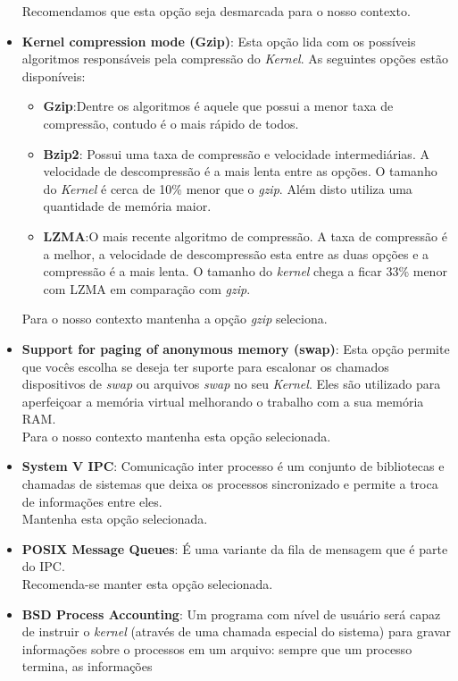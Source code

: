 \documentclass[a4paper,10pt]{article}
\begin{document}
\begin{itemize}
	      Recomendamos que esta opção seja desmarcada para o nosso contexto.
	\item \textbf{Kernel compression mode (Gzip)}: Esta opção lida com os possíveis algoritmos responsáveis pela compressão do \emph{Kernel}. 
	      As seguintes opções estão disponíveis:
	      \begin{itemize}
	      \item \textbf{Gzip}:Dentre os algoritmos é aquele que possui a menor taxa de compressão, contudo é o mais rápido de todos.
	      \item \textbf{Bzip2}: Possui uma taxa de compressão e velocidade intermediárias. A velocidade de descompressão é a mais lenta entre
		      as opções. O tamanho do \emph{Kernel} é cerca de 10\% menor que o \emph{gzip}. Além disto utiliza uma quantidade de memória
		      maior.
	      \item \textbf{LZMA}:O mais recente algoritmo de compressão. A taxa de compressão é a melhor, a velocidade de descompressão esta 
		      entre as duas opções e a compressão é a mais lenta. O tamanho do \emph{kernel} chega a ficar 33\% menor com LZMA em
		      comparação com \emph{gzip}.
	      \end{itemize}
	      Para o nosso contexto mantenha a opção \emph{gzip} seleciona.
	\item \textbf{Support for paging of anonymous memory (swap)}: Esta opção permite que vocês escolha se deseja ter suporte para escalonar 
		os chamados dispositivos de \emph{swap} ou arquivos \emph{swap} no seu \emph{Kernel}. Eles são utilizado para aperfeiçoar a memória 
		virtual melhorando o trabalho com a sua memória RAM.\\
		Para o nosso contexto mantenha esta opção selecionada.
	\item \textbf{System V IPC}: Comunicação inter processo é um conjunto de bibliotecas e chamadas de sistemas que deixa os processos 
		sincronizado e permite a troca de informações entre eles.\\
		Mantenha esta opção selecionada.
	\item \textbf{POSIX Message Queues}: É uma variante da fila de mensagem que é parte do IPC.\\ 
		Recomenda-se manter esta opção selecionada.
	\item \textbf{BSD Process Accounting}: Um programa com nível de usuário será capaz de instruir o \emph{kernel} (através de uma chamada 
		especial do sistema) para gravar informações sobre o processos em um arquivo: sempre que um processo termina, as informações 

\end{itemize}
\end{document}
